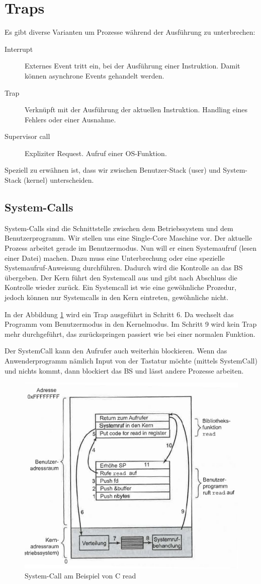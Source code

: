 \section{Traps}
Es gibt diverse Varianten um Prozesse während der Ausführung zu unterbrechen:
\begin{description}
	\item[Interrupt] Externes Event tritt ein, bei der Ausführung einer Instruktion. Damit können asynchrone Events gehandelt werden.
	\item[Trap] Verknüpft mit der Ausführung der aktuellen Instruktion. Handling eines Fehlers oder einer Ausnahme.
	\item[Supervisor call] Expliziter Request. Aufruf einer OS-Funktion.
\end{description}

Speziell zu erwähnen ist, dass wir zwischen Benutzer-Stack (user) und System-Stack (kernel) unterscheiden.

\subsection{System-Calls}
System-Calls sind die Schnittstelle zwischen dem Betriebssystem und dem Benutzerprogramm. Wir stellen uns eine Single-Core Maschine vor. Der aktuelle Prozess arbeitet gerade im Benutzermodus. Nun will er einen Systemaufruf (lesen einer Datei) machen. Dazu muss eine Unterbrechung oder eine spezielle Systemaufruf-Anweisung durchführen. Dadurch wird die Kontrolle an das BS übergeben. Der Kern führt den Systemcall aus und gibt nach Abschluss die Kontrolle wieder zurück. Ein Systemcall ist wie eine gewöhnliche Prozedur, jedoch können nur Systemcalls in den Kern eintreten, gewöhnliche nicht.

In der Abbildung \ref{fig:system-software-ablauf-c-read} wird ein Trap ausgeführt in Schritt 6. Da wechselt das Programm vom Benutzermodus in den Kernelmodus. Im Schritt 9 wird kein Trap mehr durchgeführt, das zurückspringen passiert wie bei einer normalen Funktion.

Der SystemCall kann den Aufrufer auch weiterhin blockieren. Wenn das Anwenderprogramm nämlich Input von der Tastatur möchte (mittels SystemCall) und nichts kommt, dann blockiert das BS und lässt andere Prozesse arbeiten.

\begin{figure}[h!]
\centering
\includegraphics[width=0.6\linewidth]{fig/system-software-ablauf-c-read}
\caption{System-Call am Beispiel von C read}
\label{fig:system-software-ablauf-c-read}
\end{figure}


